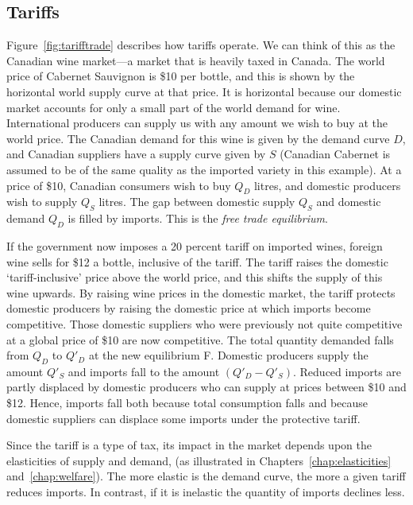\newhtmlpage

\subsection*{Tariffs}

Figure~\ref{fig:tarifftrade} describes how tariffs operate. We can think of
this as the Canadian wine market---a market that is heavily taxed in Canada.
The world price of Cabernet Sauvignon is \$10 per bottle, and this is shown
by the horizontal world supply curve at that price. It is horizontal because
our domestic market accounts for only a small part of the world demand for
wine. International producers can supply us with any amount we wish to buy
at the world price. The Canadian demand for this wine is given by the demand
curve $D$, and Canadian suppliers have a supply curve given by $S$ (Canadian
Cabernet is assumed to be of the same quality as the imported variety in
this example). At a price of \$10, Canadian consumers wish to buy $Q_{D}$
litres, and domestic producers wish to supply $Q_{S}$ litres. The gap
between domestic supply $Q_{S}$ and domestic demand $Q_{D}$ is filled by
imports. This is the \textit{free trade equilibrium}.



\newhtmlpage

If the government now imposes a 20 percent tariff on imported wines, foreign
wine sells for \$12 a bottle, inclusive of the tariff. The tariff raises the
domestic `tariff-inclusive' price above the world price, and this shifts the
supply of this wine upwards. By raising wine prices in the domestic market,
the tariff protects domestic producers by raising the domestic price at
which imports become competitive. Those domestic suppliers who were
previously not quite competitive at a global price of \$10 are now
competitive. The total quantity demanded falls from $Q_D$ to $Q'_D$ 
at the new equilibrium F. Domestic producers supply the amount $Q'_S$ 
and imports fall to the amount $(Q'_D-Q'_S)$. Reduced 
imports are partly displaced by domestic
producers who can supply at prices between \$10 and \$12. Hence, imports
fall both because total consumption falls and because domestic suppliers can
displace some imports under the protective tariff.

Since the tariff is a type of tax, its impact in the market depends upon the
elasticities of supply and demand, (as illustrated in 
Chapters~\ref{chap:elasticities} and~\ref{chap:welfare}). The
more elastic is the demand curve, the more a given tariff reduces imports.
In contrast, if it is inelastic the quantity of imports declines less.

